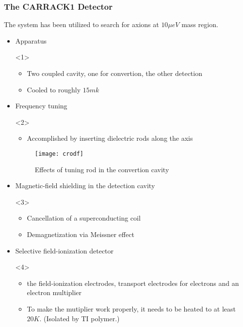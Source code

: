 \documentclass{beamer}
\begin{document}
\begin{frame}
  \frametitle{The CARRACK1 Detector}
  The system has been utilized to search for axions at $10\mu eV$ mass region.
  \begin{itemize}
  \item<1-> Apparatus
    \begin{onlyenv}<1>
      \begin{itemize}
      \item Two coupled cavity, one for convertion, the other detection
      \item Cooled to roughly $15mk$
      \end{itemize}
    \end{onlyenv} 
  \item<2-> Frequency tuning
    \begin{onlyenv}<2>
      \begin{itemize}
      \item Accomplished by inserting dielectric rods along the axis 
      \end{itemize}
      \begin{figure}
        \centering
        \texttt{[image: crodf]}
        \caption{Effects of tuning rod in the convertion cavity}
      \end{figure}
     \end{onlyenv}
   \item<3-> Magnetic-field shielding in the detection cavity
     \begin{onlyenv}<3>
       \begin{itemize}
       \item Cancellation of a superconducting coil
       \item Demagnetization via Meissner effect
       \end{itemize}
     \end{onlyenv}
   \item<4-> Selective field-ionization detector
     \begin{onlyenv}<4>
       \begin{itemize}
       \item the field-ionization electrodes, transport electrodes for
         electrons and an electron multiplier
       \item To make the mutiplier work properly, it needs to be heated to at
         least $20K$. (Isolated by TI polymer.)
       \end{itemize}
     \end{onlyenv}
  \end{itemize}
\end{frame}
\end{document}
